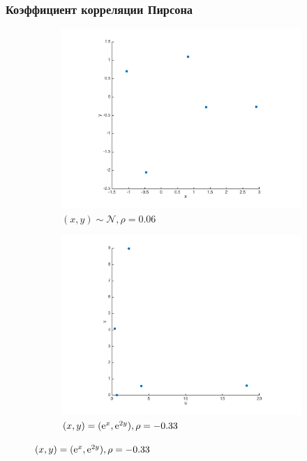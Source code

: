 \documentclass[11pt]{beamer}
\begin{document}
\begin{frame}
\frametitle{Коэффициент корреляции Пирсона}
\begin{figure}\label{fig:pearson}
\centering
\begin{subfigure}{.45\textwidth}
  \centering
  \includegraphics[width = \textwidth]{./images/normscatter.png}
  \caption{$(x, y) \sim \mathcal{N}, \rho = 0.06 $}
  \label{fig:norm}
\end{subfigure}
\begin{subfigure}{.45\textwidth}
  \centering
  \includegraphics[width = \textwidth]{./images/transformed_normscatter.png}
  \caption{$(x, y) = (\mathrm{e}^x, \mathrm{e}^{2y}), \rho = -0.33$}
  \label{fig:transnorm}
\end{subfigure}
\end{figure}
\end{frame}
\end{document}

